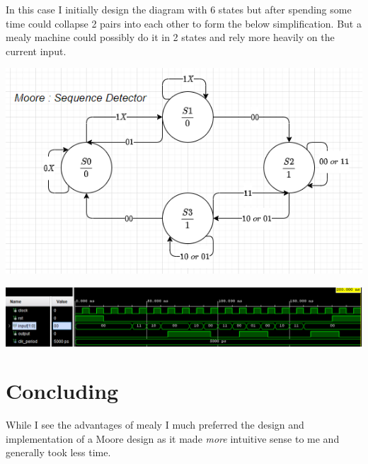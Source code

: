 \documentclass[11pt]{article}
\begin{document}
\begin{preview}
  In this case I initially design the diagram with 6 states but after spending some time could collapse 2 pairs into each other to form the below simplification. But a mealy machine could possibly do it in 2 states and rely more heavily on the current input.

  \includegraphics[width=\textwidth]{inc/moore_diagram}
  
  \includegraphics[width=\textwidth]{inc/moore}
  
  \section*{Concluding}
  While I see the advantages of mealy I much preferred the design and implementation of a Moore design as it made \textit{more} intuitive sense to me and generally took less time.
\end{preview}
\end{document}

